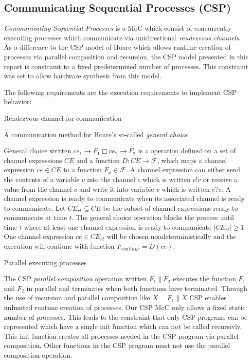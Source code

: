 \subsection{Communicating Sequential Processes (CSP)}
\emph{Communicating Sequential Processes} \cite{csphoare:1985}
is a MoC which consist of concurrently executing processes
which communicate via unidirectional \emph{rendezvous channels}.
As a difference to the CSP model of Hoare \cite{csphoare:1985}
which allows runtime creation of processes via parallel
composition and recursion, the CSP model presented in this report
is constraint to a fixed predetermined number of processes.
This constraint was set to allow hardware synthesis from this
model.

The following requirements are the execution requirements to
implement CSP behavior:

\begin{requirement}\label{requirement-csp-rendezvous}
  Rendezvous channel for communication
\end{requirement}

\begin{requirement}\label{requirement-csp-general-choice}
  A communication method for Hoare's so-called \emph{general choice}
  
  General choice written $ce_{1} \to F_1 \Box ce_{2} \to F_2$
  is a operation defined on a set of channel expressions $CE$ and
  a function $D: CE \to \mathcal{F}$, which maps a channel expression
  $ce \in CE$ to a function $F_{x} \in \mathcal{F}$. A channel
  expression can either send the contents of a variable $v$ into
  the channel $c$ which is written $c!v$ or receive a value from
  the channel $c$ and write it into variable $v$ which is written
  $c?v$. A channel expression is ready to communicate when its
  associated channel is ready to communicate.
  Let $CE_{rt} \subseteq CE$ be the subset of channel expressions
  ready to communicate at time $t$. The general choice operation
  blocks the process until time $t$ where at least one channel expression
  is ready to communicate $|CE_{rt}| \ge 1$. One channel expression
  $ce \in CE_{rt}$ will be chosen nondeterministically and the
  execution will contiune with function $F_{continue} = D(ce)$.
\end{requirement}

\begin{requirement}\label{requirement-csp-concurrent-processes}
  Parallel executing processes
  
  The CSP \emph{parallel composition} operation written $F_1 \| F_2$ executes the
  function $F_1$ and $F_2$ in parallel and terminates when both functions
  have terminated. Through the use of recursion and parallel composition
  like $X = F_1 \| X$ CSP enables unlimited runtime creation of processes.
  Our CSP MoC only allows a fixed static number of processes. This
  leads to the constraint that only CSP programs can be represented which
  have a single init function which can not be called recursivly. This init
  function creates all processes needed in the CSP program via parallel composition.
  Other functions in the CSP program must not use the parallel composition
  operation.
\end{requirement}

